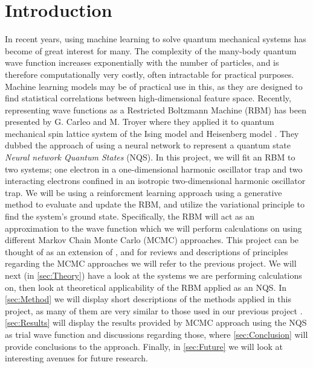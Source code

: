 \section{Introduction}\label{sec:Introduction}

In recent years, using machine learning to solve quantum mechanical systems has become of great interest for many. The complexity of the many-body quantum wave function increases exponentially with the number of particles, and is therefore computationally very costly, often intractable for practical purposes. Machine learning models may be of practical use in this, as they are designed to find statistical correlations between high-dimensional feature space. Recently, representing wave functions as a Restricted Boltzmann Machine (RBM) has been presented by G. Carleo and M. Troyer where they applied it to quantum mechanical spin lattice system of the Ising model and Heisenberg model \citep{Carleo_2017}. They dubbed the approach of using a neural network to represent a quantum state \textit{Neural network Quantum States} (NQS). In this project, we will fit an RBM to two systems; one electron in a one-dimensional harmonic oscillator trap and two interacting electrons confined in an isotropic two-dimensional harmonic oscillator trap. We will be using a reinforcment learning approach using a generative method to evaluate and update the RBM, and utilize the variational principle to find the system's ground state. Specifically, the RBM will act as an approximation to the wave function which we will perform calculations on using different Markov Chain Monte Carlo (MCMC) approaches.  %
This project can be thought of as an extension of \citep{project1}, and for reviews and descriptions of principles regarding the MCMC approaches we will refer to the previous project. 
We will next (in \autoref{sec:Theory}) have a look at the systems we are performing calculations on, then look at theoretical applicability of the RBM applied as an NQS. In \autoref{sec:Method} we will display short descriptions of the methods applied in this project, as many of them are very similar to those used in our previous project \citep{project1}. \autoref{sec:Results} will display the results provided by MCMC approach using the NQS as trial wave function and discussions regarding those, where \autoref{sec:Conclusion} will provide conclusions to the approach. Finally, in \autoref{sec:Future} we will look at interesting avenues for future research. 

\iffalse
We will test our implementation against a Variational Monte Carlo method with optimization algorithms such as ADAM (which will also be used to find an upper limit for the ground state?)

As quantum mechanical systems become more complex, it becomes exponentially harder to solve the problem numerically, and only the simplest of models have an analytical solution. 

1. G. Carleo and M. Troyer, Science 355, Issue 6325, pp. 602-606 (2017)
\fi